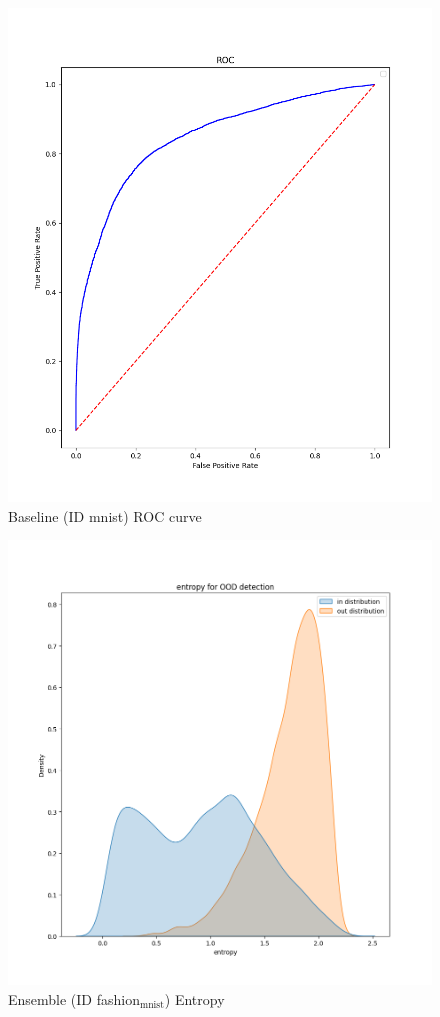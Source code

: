 \documentclass[11pt]{article}
\begin{document}
\begin{figure}[htbp]
\centering
\includegraphics[width=.9\linewidth]{./base_mnist_roc.png}
\caption{\label{fig:org3cd6800}
Baseline (ID mnist) ROC curve}
\end{figure}

\begin{figure}[htbp]
\centering
\includegraphics[width=.9\linewidth]{./ens_fash_entropy.png}
\caption{\label{fig:org38b1854}
Ensemble (ID fashion\(_{\text{mnist}}\)) Entropy}
\end{figure}
\end{document}

